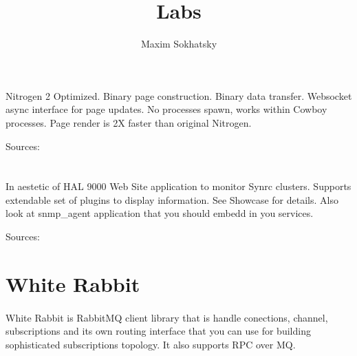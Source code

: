 \documentclass[11pt]{article}
\begin{document}
\title{Labs}
\author{Maxim Sokhatsky}


\section*{}
\paragraph{}
Nitrogen 2 Optimized. Binary page construction. Binary data transfer.
Websocket async interface for page updates. No processes spawn, works
within Cowboy processes. Page render is 2X faster than original Nitrogen.

Sources: 

\section*{}
\paragraph{}
In aestetic of HAL 9000 Web Site application to monitor Synrc clusters.
Supports extendable set of plugins to display information. See Showcase for details.
Also look at snmp_agent application that you should embedd in you services.

Sources: 

\section*{White Rabbit}
\paragraph{}
White Rabbit is RabbitMQ client library that is handle conections, channel,
subscriptions and its own routing interface that you can use for building
sophisticated subscriptions topology. It also supports RPC over MQ.
\end{document}
